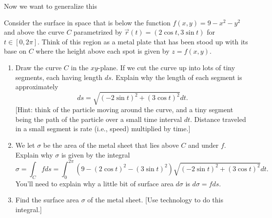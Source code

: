 Now we want to generalize this 

\begin{problem}
%
%
 Consider the surface in space that is below the function 
$f(x,y)=9-x^2-y^2$ and above the curve $C$ parametrized by 
$\vec r(t)=(2\cos t, 3\sin t)$ for $t\in[0,2\pi]$.  Think of this region as a metal plate that has been stood up with its base on $C$ where the height above each spot is given by $z=f(x,y)$.
\begin{enumerate}
 \item {}%
  Draw the curve $C$ in the $xy$-plane.  If we cut the curve up into lots of tiny segments, each having length $ds$.  Explain why the length of each segment is approximately $$ds=\sqrt{(-2\sin t)^2+(3\cos t)^2}dt.$$
[Hint: think of the particle moving around the curve, and a tiny segment being the path of the particle over a small time interval $dt$.  Distance traveled in a small segment is rate (i.e., speed) multiplied by time.]
 \item {}%
 We let $\sigma$ be the area of the metal sheet that lies above $C$ and under $f$.  Explain why $\sigma$ is given by the integral
$$\sigma = \int_C f ds = \int_0^{2\pi}(9-(2\cos t)^2-(3\sin t)^2)\sqrt{(-2\sin t)^2+(3\cos t)^2}dt.$$
 You'll need to explain why a little bit of surface area $d\sigma$ is $d\sigma =fds$. 
 \item
{}%
Find the surface area $\sigma$ of the metal sheet. [Use technology to do this integral.] 
\end{enumerate}
\end{problem}


